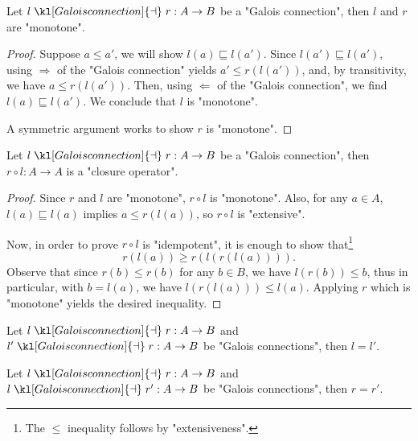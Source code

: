 \documentclass[main.tex]{subfiles}
\begin{document}
\begin{prop}
	Let $l \mathrel{\kl[Galois connection]{\dashv}} r: A\rightarrow B$ be a "Galois connection", then $l$ and $r$ are "monotone".
\end{prop}
\begin{proof}
	Suppose $a \leq a'$, we will show $l(a) \sqsubseteq l(a')$. Since $l(a') \sqsubseteq l(a')$, using $\Rightarrow$ of the "Galois connection" yields $a' \leq r(l(a'))$, and, by transitivity, we have $a \leq r(l(a'))$. Then, using $\Leftarrow$ of the "Galois connection", we find $l(a) \sqsubseteq l(a')$. We conclude that $l$ is "monotone".
	
	A symmetric argument works to show $r$ is "monotone".
\end{proof}
\begin{exmp}
\end{exmp}
\begin{prop}\label{prop:compgaloisisclosure}
	Let $l \mathrel{\kl[Galois connection]{\dashv}} r:A \rightarrow B$ be a "Galois connection", then $r\circ l: A\rightarrow A$ is a "closure operator".
\end{prop}
\begin{proof}
	Since $r$ and $l$ are "monotone", $r\circ l$ is "monotone". Also, for any $a \in A$, $l(a) \sqsubseteq l(a)$ implies $a \leq r(l(a))$, so $r\circ l$ is "extensive".
	
	Now, in order to prove $r\circ l$ is "idempotent", it is enough to show that\footnote{The $\leq$ inequality follows by "extensiveness".} \[r(l(a)) \geq r(l(r(l(a)))).\]
	Observe that since $r(b) \leq r(b)$ for any $b\in B$, we have $l(r(b)) \leq b$, thus in particular, with $b = l(a)$, we have $l(r(l(a))) \leq l(a)$. Applying $r$ which is "monotone" yields the desired inequality.
\end{proof}
\begin{prop}
	Let $l \mathrel{\kl[Galois connection]{\dashv}} r:A \rightarrow B$ and $l' \mathrel{\kl[Galois connection]{\dashv}} r:A \rightarrow B$ be "Galois connections", then $l = l'$.
\end{prop}
\begin{prop}
	Let $l \mathrel{\kl[Galois connection]{\dashv}} r:A \rightarrow B$ and $l \mathrel{\kl[Galois connection]{\dashv}} r':A \rightarrow B$ be "Galois connections", then $r = r'$.
\end{prop}
\end{document}
